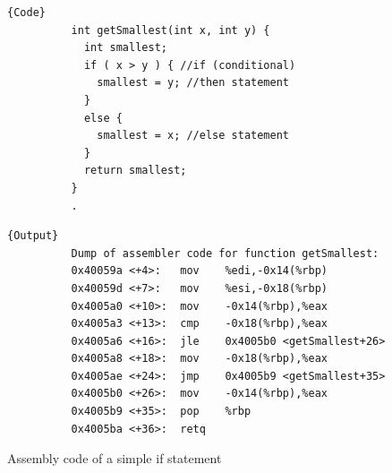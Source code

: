 \documentclass{article}
\begin{document}
      \begin{figure}[H]
        \centering 
        \noindent\begin{minipage}{.4\textwidth}
        \begin{lstlisting}[]{Code}
          int getSmallest(int x, int y) {
            int smallest;
            if ( x > y ) { //if (conditional)
              smallest = y; //then statement
            }
            else {
              smallest = x; //else statement
            }
            return smallest;
          }
          .
        \end{lstlisting}
        \end{minipage}
        \hfill
        \begin{minipage}{.59\textwidth}
        \begin{lstlisting}[]{Output}
          Dump of assembler code for function getSmallest:
          0x40059a <+4>:   mov    %edi,-0x14(%rbp)
          0x40059d <+7>:   mov    %esi,-0x18(%rbp)
          0x4005a0 <+10>:  mov    -0x14(%rbp),%eax
          0x4005a3 <+13>:  cmp    -0x18(%rbp),%eax
          0x4005a6 <+16>:  jle    0x4005b0 <getSmallest+26>
          0x4005a8 <+18>:  mov    -0x18(%rbp),%eax
          0x4005ae <+24>:  jmp    0x4005b9 <getSmallest+35>
          0x4005b0 <+26>:  mov    -0x14(%rbp),%eax
          0x4005b9 <+35>:  pop    %rbp
          0x4005ba <+36>:  retq
        \end{lstlisting}
        \end{minipage}
        \caption{Assembly code of a simple if statement} 
        \label{fig:if_statement}
      \end{figure}
\end{document}
